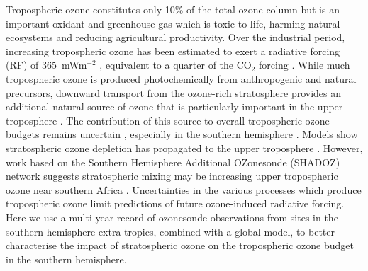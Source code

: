 \documentclass[acp, manuscript]{copernicus} %
\providecommand{\DIFadd}[1]{{\protect\color{blue}\uwave{#1}}} %
\providecommand{\DIFaddbegin}{} %
\providecommand{\DIFaddend}{} %
\begin{document}
  Tropospheric ozone constitutes only 10\% of the total ozone column but is an important oxidant and greenhouse gas which is toxic to life, harming natural ecosystems and reducing agricultural productivity.
  Over the industrial period, increasing tropospheric ozone has been estimated to exert a radiative forcing (RF) of 365~mWm$^{-2}$  \citep{Stevenson2013}, equivalent to a quarter of the CO$_2$ forcing \citep{IPCC_Chapter2}. 
  While much tropospheric ozone is produced photochemically from anthropogenic and natural precursors, %
  downward transport from the ozone-rich stratosphere provides an additional natural source of ozone that is particularly important in the upper troposphere \citep[][and references therein]{Jacobson2000}.
  The contribution of this source to overall tropospheric ozone budgets remains uncertain \citep{Skerlak2014}, especially in the southern hemisphere \DIFaddbegin \DIFadd{(SH)}\DIFaddend .
  Models show \DIFaddbegin \DIFadd{that }\DIFaddend stratospheric ozone depletion has propagated to the upper troposphere \citep{Stevenson2013}. 
  However, work based on the Southern Hemisphere Additional OZonesonde (SHADOZ) network suggests stratospheric mixing may be increasing upper tropospheric ozone near southern Africa \citep{Liu2015, Thompson2014}.
  Uncertainties in the various processes which produce tropospheric ozone limit predictions of future ozone-induced radiative forcing.
  Here we use a multi-year record of ozonesonde observations from sites in the southern hemisphere extra-tropics, combined with a global model, to better characterise the impact of stratospheric ozone on the tropospheric ozone budget in the southern hemisphere.
\end{document}

